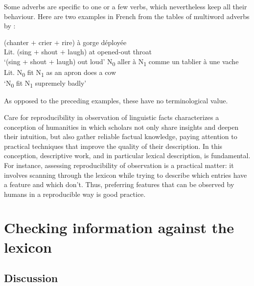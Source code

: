 \documentclass[output=paper]{langsci/langscibook}
\begin{document}
Some adverbs are specific to one or a few verbs, which nevertheless keep all their behaviour. Here are two examples in French from the tables of multiword adverbs by \citet{Gross1986}:

\begin{exe}
\ex \label{53}
\begin{xlist}
\ex \label{53a}
(chanter $+$  crier $+$  rire) à gorge déployée\\
Lit. (sing $+$  shout $+$  laugh) at opened-out throat\\
‘(sing + shout + laugh) out loud’
\ex \label{53b}
 N\textsubscript{0} aller à N\textsubscript{1}  comme un tablier à une vache\\
Lit.  N\textsubscript{0} fit N\textsubscript{1} as an apron does a cow\\
‘N\textsubscript{0} fit N\textsubscript{1} supremely badly’
\end{xlist}
\end{exe}

\noindent As opposed to the preceding examples, these have no terminological value.

Care for reproducibility in observation of linguistic facts characterizes a conception of humanities in which scholars not only share insights and deepen their intuition, but also gather reliable factual knowledge, paying attention to practical techniques that improve the quality of their description. In this conception, descriptive work, and in particular lexical description, is fundamental. For instance, assessing reproducibility of observation is a practical matter: it involves scanning through the lexicon while trying to describe which entries have a feature and which don’t. Thus, preferring features that can be observed by humans in a reproducible way is good practice.

\section{Checking information against the lexicon}
\label{sec:5}

\subsection{Discussion} 
\label{sec:51}
\end{document}
